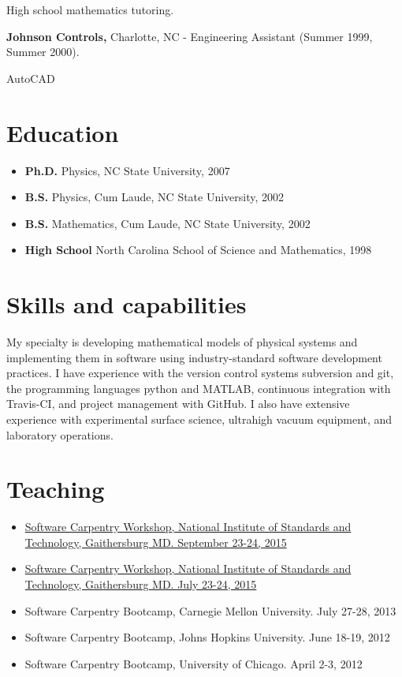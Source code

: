 High school mathematics tutoring.

\textbf{Johnson Controls,} Charlotte, NC - Engineering Assistant (Summer
1999, Summer 2000).

AutoCAD

\section{Education}

\begin{itemize}
\itemsep1pt\parskip0pt
\item
  \textbf{Ph.D.} Physics, NC State University, 2007
\item
  \textbf{B.S.} Physics, Cum Laude, NC State University, 2002
\item
  \textbf{B.S.} Mathematics, Cum Laude, NC State University, 2002
\item
  \textbf{High School} North Carolina School of Science and Mathematics,
  1998
\end{itemize}

\section{Skills and capabilities}

My specialty is developing mathematical models of physical systems and
implementing them in software using industry-standard software
development practices. I have experience with the version control
systems subversion and git, the programming languages python and MATLAB,
continuous integration with Travis-CI, and project management with
GitHub. I also have extensive experience with experimental surface
science, ultrahigh vacuum equipment, and laboratory operations.

\section{Teaching}

\begin{itemize}
\tightlist
\item
  \href{https://pages.nist.gov/2015-09-23-nist/}{Software Carpentry
  Workshop, National Institute of Standards and Technology, Gaithersburg
  MD. September 23-24, 2015}
\item
  \href{https://pages.nist.gov/2015-07-23-nist/}{Software Carpentry
  Workshop, National Institute of Standards and Technology, Gaithersburg
  MD. July 23-24, 2015}
\item
  Software Carpentry Bootcamp, Carnegie Mellon University. July 27-28,
  2013
\item
  Software Carpentry Bootcamp, Johns Hopkins University. June 18-19,
  2012
\item
  Software Carpentry Bootcamp, University of Chicago. April 2-3, 2012
\end{itemize}

